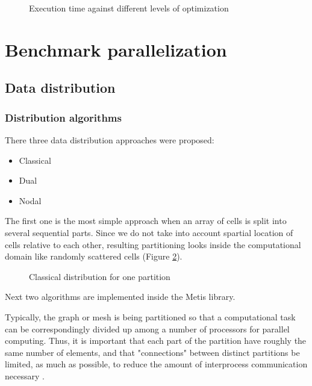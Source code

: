 \documentclass[12pt, a4paper]{article}
\begin{document}
\begin{figure}[ht]
	\caption{Execution time against different levels of optimization}
	\label{fig:OpFlags}
\end{figure}


\section{Benchmark parallelization}


\subsection{Data distribution}


\subsubsection{Distribution algorithms}

There three data distribution approaches were proposed: 
\begin{itemize}
	\item Classical
	\item Dual
	\item Nodal
\end{itemize}

The first one is the most simple approach when an array of cells is split into several
sequential parts. Since we do not take into account spartial location of cells
relative to each other, resulting partitioning looks inside the computational domain like
randomly scattered cells (Figure \ref{fig:Classical}).

\begin{figure}[ht]
	\caption{Classical distribution for one partition}
	\label{fig:Classical}
\end{figure}

Next two algorithms are implemented inside the Metis library.

Typically, the graph or mesh is being partitioned so that a computational task 
can be correspondingly divided up among a number of processors for parallel computing. 
Thus, it is important that each part of the partition have roughly the same number of elements, 
and that "connections" between distinct partitions be limited, as much as possible, 
to reduce the amount of interprocess communication necessary \cite{metis}.
\end{document}

